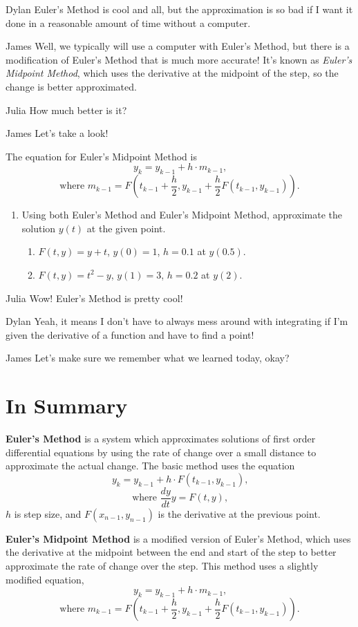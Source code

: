 \documentclass{ximera}
\begin{document}
\begin{dialogue}
\item[Dylan] Euler's Method is cool and all, but the approximation is so bad if I want it done in a reasonable amount of time without a computer.
\item[James] Well, we typically will use a computer with Euler's Method, but there is a modification of Euler's Method that is much more accurate! It's known as \textit{Euler's Midpoint Method}, which uses the derivative at the midpoint of the step, so the change is better approximated.
\item[Julia] How much better is it?
\item[James] Let's take a look!
\end{dialogue}
The equation for Euler's Midpoint Method is $$y_k = y_{k-1}+h \cdot m_{k-1}\text{,}$$ $$\text{where } m_{k-1} = F\left(t_{k-1} + \frac{h}{2}, y_{k-1} + \frac{h}{2}F(t_{k-1},y_{k-1})\right)\text{.}$$ 
\begin{enumerate}
\item Using both Euler's Method and Euler's Midpoint Method, approximate the solution $y(t)$ at the given point. 
\begin{enumerate}
\item $F(t, y) = y+t$, $y(0) = 1$, $h = 0.1$ at $y(0.5)$.
\item $F(t, y) = t^2 - y$, $y(1) = 3$, $h=0.2$ at $y(2)$.
\end{enumerate}
\end{enumerate}
\begin{dialogue}
\item[Julia] Wow! Euler's Method is pretty cool!
\item[Dylan] Yeah, it means I don't have to always mess around with integrating if I'm given the derivative of a function and have to find a point!
\item[James] Let's make sure we remember what we learned today, okay?
\end{dialogue}
\section{In Summary}
\begin{definition}
\textbf{Euler's Method} is a system which approximates solutions of first order differential equations by using the rate of change over a small distance to approximate the actual change. The basic method uses the equation $$y_k = y_{k-1} + h \cdot F(t_{k-1}, y_{k-1})\text{,}$$ $$\text{where } \dfrac{dy}{dt} y = F(t,y) \text{,}$$ $h$ is step size, and $F(x_{n-1}, y_{n-1})$ is the derivative at the previous point.
\end{definition}
\begin{definition}
\textbf{Euler's Midpoint Method} is a modified version of Euler's Method, which uses the derivative at the midpoint between the end and start of the step to better approximate the rate of change over the step. This method uses a slightly modified equation, $$y_k = y_{k-1}+h \cdot m_{k-1}\text{,}$$ $$\text{where } m_{k-1} = F\left(t_{k-1} + \frac{h}{2}, y_{k-1} + \frac{h}{2}F(t_{k-1},y_{k-1})\right)\text{.}$$
\end{definition}
\end{document}
